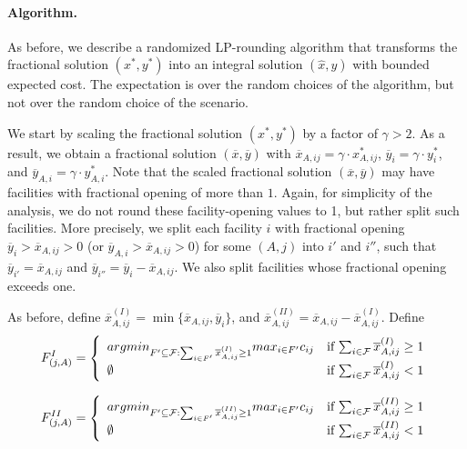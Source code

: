 \documentclass[11pt]{article}
\newcommand{\F}{\mathcal{F}}
\begin{document}
\paragraph{Algorithm.}

As before, we describe a randomized LP-rounding algorithm that transforms the fractional 
solution $(x^*,y^*)$ into an integral solution $(\hat{x},\hat{y})$ with bounded expected cost.
The expectation is over the random choices of the algorithm, but not over the
random choice of the scenario. 


We start by scaling the fractional solution $(x^*,y^*)$ by a factor of $\gamma > 2$.
As a result, we obtain a fractional solution $(\overline{x},\overline{y})$
with $\overline{x}_{A,ij} = \gamma \cdot x^*_{A,ij} $, $\overline{y}_i =  \gamma \cdot y^*_i $,
and $\overline{y}_{A,i} =  \gamma \cdot y^*_{A,i} $. Note that the scaled fractional solution
$(\overline{x},\overline{y})$ may have facilities with fractional opening of more than $1$.
Again, for simplicity of the analysis, we do not round these facility-opening values to 1, but rather split such facilities.
More precisely, we split each facility $i$ with fractional opening $\overline{y}_i > \overline{x}_{A,ij} > 0$ (or $\overline{y}_{A,i} > \overline{x}_{A,ij} > 0$) for some $(A, j)$ into $i'$ and $i''$, such that 
 $\overline{y}_{i'} = \overline{x}_{A,ij}$ and $\overline{y}_{i''} = \overline{y}_i - \overline{x}_{A,ij}$.
We also split facilities whose fractional opening exceeds one.


As before, define $\overline{x}^{(I)}_{A,ij} = \min \{\overline{x}_{A,ij}, \overline{y}_i \}$, and 
$\overline{x}^{(II)}_{A,ij} = \overline{x}_{A,ij} - \overline{x}^{(I)}_{A,ij}$.
Define \\ 
\[
F_{(j,A)}^I = \left\{ 
\begin{array}{l l}
    argmin_{F' \subseteq \F : \sum_{i \in F'} \overline{x}^{(I)}_{A,ij} \geq 1 } max_{i \in F'} c_{ij} &  
    \mbox{if $\sum_{i \in \F} \overline{x}^{(I)}_{A,ij} \geq 1$}\\
  \emptyset &  \mbox{if $\sum_{i \in \F} \overline{x}^{(I)}_{A,ij} < 1$}\\
\end{array} \right.
\]

\[
F_{(j,A)}^{II} = \left\{ 
\begin{array}{l l}
    argmin_{F' \subseteq \F : \sum_{i \in F'} \overline{x}^{(II)}_{A,ij} \geq 1 } max_{i \in F'} c_{ij} &  
    \mbox{if $\sum_{i \in \F} \overline{x}^{(II)}_{A,ij} \geq 1$}\\
  \emptyset &  \mbox{if $\sum_{i \in \F} \overline{x}^{(II)}_{A,ij} < 1$}\\
\end{array} \right.
\]
\end{document}
